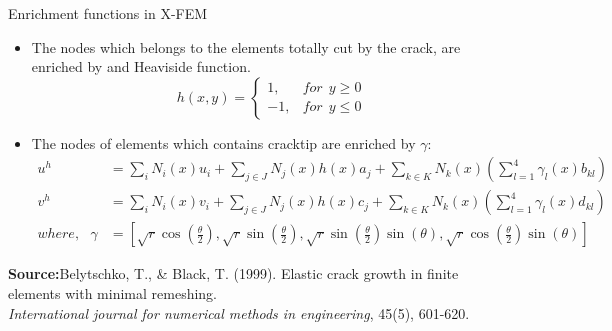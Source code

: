 \documentclass{beamer}
\begin{document}
\begin{frame}[t,fragile]{Enrichment functions in X-FEM}
    \vspace{-.3cm}
     \footnotesize
    \begin{itemize}
         \item The nodes which belongs to the elements totally cut by the crack, are enriched by and Heaviside function.
    $$h(x,y)=\begin{cases}1,&       for ~ ~ y\ge 0\\ -1,&       for~ ~ y\le 0\end{cases}$$ 
\item The nodes of elements which contains cracktip are enriched by $\gamma$:
     \footnotesize
    \begin{align*}
     u^h&=\sum_i N_i(x)u_i+\sum_{j\in J} N_j(x) h(x)a_j+\sum_{k\in K} N_k(x)\left( \sum_{l=1}^{4}\gamma_l(x)b_{kl} \right) \\
    v^h&=\sum_i N_i(x)v_i+\sum_{j\in J} N_j(x) h(x)c_j+\sum_{k\in K} N_k(x)\left( \sum_{l=1}^{4}\gamma_l(x)d_{kl} \right) \\ 
     where,\ \ \ \gamma&=\left[ \sqrt{r}\cos \left( \frac{\theta}{2} \right), \sqrt{r}\sin\left( \frac{\theta}{2} \right),\sqrt{r}\sin\left( \frac{\theta}{2} \right)\sin(\theta),\sqrt{r}\cos\left( \frac{\theta}{2} \right)\sin(\theta)\right] 
\end{align*}
\end{itemize}
\tiny
\hspace{10pt}
\textbf{Source:}Belytschko, T., \& Black, T. (1999). Elastic crack growth in finite elements with minimal remeshing. \\
\vspace{-7pt}
\hspace{10pt}
\emph{International journal for numerical methods in engineering}, 45(5), 601-620.
\end{frame}
\end{document}
